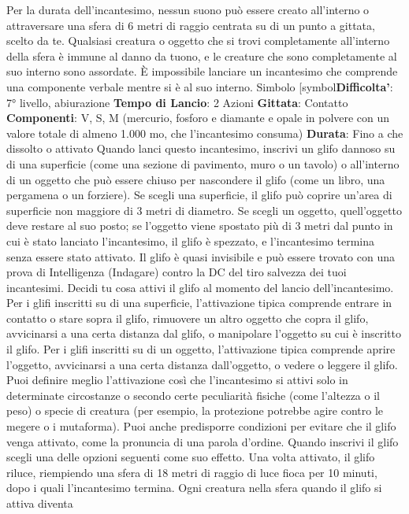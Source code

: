 \begin{multicols}{2}
Per la durata dell’incantesimo, nessun suono può
essere creato all’interno o attraversare una sfera di 6
metri di raggio centrata su di un punto a gittata, scelto
da te. Qualsiasi creatura o oggetto che si trovi
completamente all’interno della sfera è immune al
danno da tuono, e le creature che sono completamente
al suo interno sono assordate. È impossibile lanciare un
incantesimo che comprende una componente verbale
mentre si è al suo interno.
Simbolo
[symbol\textbf{Difficolta'}:
7° livello, abiurazione
\textbf{Tempo di Lancio}: 2 Azioni
\textbf{Gittata}: Contatto
\textbf{Componenti}: V, S, M (mercurio, fosforo e diamante e
opale in polvere con un valore totale di almeno 1.000
mo, che l’incantesimo consuma)
\textbf{Durata}: Fino a che dissolto o attivato
Quando lanci questo incantesimo, inscrivi un glifo
dannoso su di una superficie (come una sezione di
pavimento, muro o un tavolo) o all’interno di un oggetto
che può essere chiuso per nascondere il glifo (come un
libro, una pergamena o un forziere). Se scegli una
superficie, il glifo può coprire un’area di superficie non
maggiore di 3 metri di diametro. Se scegli un oggetto,
quell’oggetto deve restare al suo posto; se l’oggetto 
viene spostato più di 3 metri dal punto in cui è stato
lanciato l’incantesimo, il glifo è spezzato, e
l’incantesimo termina senza essere stato attivato.
Il glifo è quasi invisibile e può essere trovato con una
prova di Intelligenza (Indagare) contro la DC del tiro
salvezza dei tuoi incantesimi.
Decidi tu cosa attivi il glifo al momento del lancio
dell’incantesimo.
Per i glifi inscritti su di una superficie, l’attivazione tipica
comprende entrare in contatto o stare sopra il glifo,
rimuovere un altro oggetto che copra il glifo, avvicinarsi
a una certa distanza dal glifo, o manipolare l’oggetto su
cui è inscritto il glifo.
Per i glifi inscritti su di un oggetto, l’attivazione tipica
comprende aprire l’oggetto, avvicinarsi a una certa
distanza dall’oggetto, o vedere o leggere il glifo.
Puoi definire meglio l’attivazione così che l’incantesimo
si attivi solo in determinate circostanze o secondo certe
peculiarità fisiche (come l’altezza o il peso) o specie di
creatura (per esempio, la protezione potrebbe agire
contro le megere o i mutaforma). Puoi anche
predisporre condizioni per evitare che il glifo venga
attivato, come la pronuncia di una parola d’ordine.
Quando inscrivi il glifo scegli una delle opzioni seguenti
come suo effetto. Una volta attivato, il glifo riluce,
riempiendo una sfera di 18 metri di raggio di luce fioca
per 10 minuti, dopo i quali l’incantesimo termina. Ogni
creatura nella sfera quando il glifo si attiva diventa

\end{multicols}
